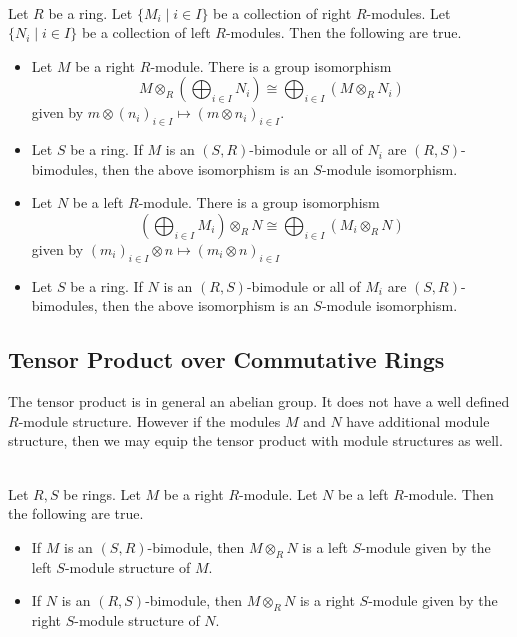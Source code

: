 \documentclass[a4paper]{article}
\begin{document}
\begin{prp}{}{}\\
Let $R$ be a ring. Let $\{M_i\;|\;i\in I\}$ be a collection of right $R$-modules. Let $\{N_i\;|\;i\in I\}$ be a collection of left $R$-modules. Then the following are true. 
\begin{itemize}
\item Let $M$ be a right $R$-module. There is a group isomorphism $$M\otimes_R\left(\bigoplus_{i\in I}N_i\right)\cong\bigoplus_{i\in I}(M\otimes_R N_i)$$ given by $m\otimes(n_i)_{i\in I}\mapsto(m\otimes n_i)_{i\in I}$. 
\item Let $S$ be a ring. If $M$ is an $(S,R)$-bimodule or all of $N_i$ are $(R,S)$-bimodules, then the above isomorphism is an $S$-module isomorphism. 
\item Let $N$ be a left $R$-module. There is a group isomorphism $$
\left(\bigoplus_{i\in I}M_i\right)\otimes_R N\cong\bigoplus_{i\in I}(M_i\otimes_RN)$$ given by $(m_i)_{i\in I}\otimes n\mapsto(m_i\otimes n)_{i\in I}$
\item Let $S$ be a ring. If $N$ is an $(R,S)$-bimodule or all of $M_i$ are $(S,R)$-bimodules, then the above isomorphism is an $S$-module isomorphism. 
\end{itemize}
\end{prp}

\subsection{Tensor Product over Commutative Rings}
The tensor product is in general an abelian group. It does not have a well defined $R$-module structure. However if the modules $M$ and $N$ have additional module structure, then we may equip the tensor product with module structures as well. 

\begin{prp}{}{}\\
Let $R,S$ be rings. Let $M$ be a right $R$-module. Let $N$ be a left $R$-module. Then the following are true. 
\begin{itemize}
\item If $M$ is an $(S,R)$-bimodule, then $M\otimes_RN$ is a left $S$-module given by the left $S$-module structure of $M$. 
\item If $N$ is an $(R,S)$-bimodule, then $M\otimes_RN$ is a right $S$-module given by the right $S$-module structure of $N$. 
\end{itemize}
\end{prp}
\end{document}
